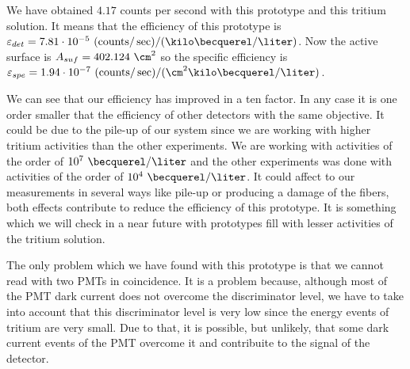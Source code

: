 We have obtained $4.17$ counts per second with this prototype and this tritium solution. It means that the efficiency of this prototype is $\varepsilon_{det} = 7.81 \cdot 10^{-5}~(\ce{counts}/\sec)/(\kilo\becquerel/\liter)$. Now the active surface is $A_{suf} = 402.124~\cm^2$ so the specific efficiency is $\varepsilon_{spe} = 1.94 \cdot 10^{-7}~(\ce{counts}/\sec)/(\cm^{2}\kilo\becquerel/\liter)$. 

We can see that our efficiency has improved in a ten factor. In any case it is one order smaller that the efficiency of other detectors with the same objective. It could be due to the pile-up of our system since we are working with higher tritium activities than the other experiments. We are working with activities of the order of $10^{7}~\becquerel/\liter$  and the other experiments was done with activities of the order of $10^{4}~\becquerel/\liter$. It could affect to our measurements in several ways like pile-up or producing a damage of the fibers, both effects contribute to reduce the efficiency of this prototype. It is something which we will check in a near future with prototypes fill with lesser activities of the tritium solution.

The only problem which we have found with this prototype is that we cannot read with two PMTs in coincidence. It is a problem because, although most of the PMT dark current does not overcome the discriminator level, we have to take into account that this discriminator level is very low  since the energy events of tritium are very small. Due to that, it is possible, but unlikely, that some dark current events of the PMT overcome it and contribuite to the signal of the detector. 